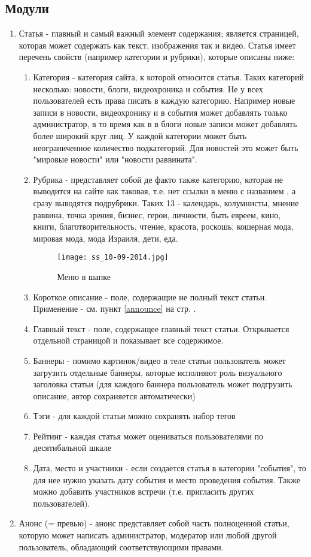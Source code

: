 \documentclass[DIV=calc, paper=a4, fontsize=11pt]{scrartcl} %
\begin{document}
\subsection{Модули}


\begin{enumerate}
\item Статья - главный и самый важный элемент содержания; является страницей, которая может содержать как текст, изображения так и видео. Статья имеет перечень свойств (например категории и рубрики), которые описаны ниже:
    \begin{enumerate}
    \item{Категория} - категория сайта, к которой относится статья. Таких категорий несколько: новости, блоги, видеохроника и события. Не у всех пользователей есть права писать в каждую категорию. Например новые записи в новости, видеохронику и в события может добавлять только администратор, в то время как в в блоги новые записи может добавлять более широкий круг лиц. У каждой категории может быть неограниченное количество \label{subcategory} подкатегорий. Для новостей это может быть "мировые новости" или "новости раввината".
    \item{Рубрика} - представляет собой де факто также категорию, которая не выводится на сайте как таковая, т.е. нет ссылки в меню с названием , а сразу выводятся подрубрики. Таких 13 - календарь, колумнисты, мнение раввина, точка зрения, бизнес, герои, личности, быть евреем, кино, книги, благотворительность, чтение, красота, роскошь, кошерная мода, мировая мода, мода Израиля, дети, еда.
        \begin{figure}[ht!]
        \centering
        \texttt{[image: ss\_10-09-2014.jpg]}
        \caption{Меню в шапке \label{overflow}}
        \end{figure}
    \item{Короткое описание} - поле, содержащие не полный текст статьи. Применение - см. пункт \ref{announce} на стр. \pageref{announce}.
    \item{Главный текст} - поле, содержащее главный текст статьи. Открывается отдельной страницой и показывает все содержимое.
    \item{Баннеры} - помимо картинок/видео в теле статьи пользователь может загрузить отдельные баннеры, которые исполняют роль визуального заголовка статьи (для каждого баннера пользователь может подгрузить описание, автор сохраняется автоматически)
    \item{Тэги} - для каждой статьи можно сохранять набор тегов
    \item{Рейтинг} - каждая статья может оцениваться пользователями по десятибальной шкале
    \item{Дата, место и участники} - если создается статья в категории "события", то для нее нужно указать дату события и место проведения события. Также можно добавить участников встречи (т.е. пригласить других пользователей). 
    \end{enumerate}
\item \label{announce}{Анонс} (= превью) - анонс представляет собой часть полноценной статьи, которую может написать администратор, модератор или любой другой пользователь, обладающий соответствующими правами.


\end{enumerate}
\end{document}
